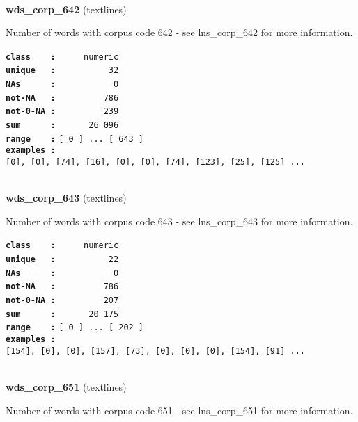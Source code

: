 \documentclass[]{article}
\begin{document}
~

\textbf{wds\_corp\_642} (textlines)

Number of words with corpus code 642 - see lns\_corp\_642 for more
information.

\textbf{\texttt{class\ \ \ \ :}} \texttt{~~~~~numeric}\\
\textbf{\texttt{unique\ \ \ :}} \texttt{~~~~~~~~~~32}\\
\textbf{\texttt{NAs\ \ \ \ \ \ :}} \texttt{~~~~~~~~~~~0}\\
\textbf{\texttt{not-NA\ \ \ :}} \texttt{~~~~~~~~~786}\\
\textbf{\texttt{not-0-NA\ :}} \texttt{~~~~~~~~~239}\\
\textbf{\texttt{sum\ \ \ \ \ \ :}} \texttt{~~~~~~26~096}\\
\textbf{\texttt{range\ \ \ \ :}}
\texttt{{[}\ 0\ {]}\ ...\ {[}\ 643\ {]}}\\
\textbf{\texttt{examples\ :}}
\texttt{{[}0{]},\ {[}0{]},\ {[}74{]},\ {[}16{]},\ {[}0{]},\ {[}0{]},\ {[}74{]},\ {[}123{]},\ {[}25{]},\ {[}125{]}\ ...}\\

~

\textbf{wds\_corp\_643} (textlines)

Number of words with corpus code 643 - see lns\_corp\_643 for more
information.

\textbf{\texttt{class\ \ \ \ :}} \texttt{~~~~~numeric}\\
\textbf{\texttt{unique\ \ \ :}} \texttt{~~~~~~~~~~22}\\
\textbf{\texttt{NAs\ \ \ \ \ \ :}} \texttt{~~~~~~~~~~~0}\\
\textbf{\texttt{not-NA\ \ \ :}} \texttt{~~~~~~~~~786}\\
\textbf{\texttt{not-0-NA\ :}} \texttt{~~~~~~~~~207}\\
\textbf{\texttt{sum\ \ \ \ \ \ :}} \texttt{~~~~~~20~175}\\
\textbf{\texttt{range\ \ \ \ :}}
\texttt{{[}\ 0\ {]}\ ...\ {[}\ 202\ {]}}\\
\textbf{\texttt{examples\ :}}
\texttt{{[}154{]},\ {[}0{]},\ {[}0{]},\ {[}157{]},\ {[}73{]},\ {[}0{]},\ {[}0{]},\ {[}0{]},\ {[}154{]},\ {[}91{]}\ ...}\\

~

\textbf{wds\_corp\_651} (textlines)

Number of words with corpus code 651 - see lns\_corp\_651 for more
information.
\end{document}
